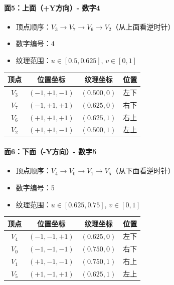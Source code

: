 \documentclass[12pt,a4paper]{article}
\begin{document}
\paragraph{面5：上面（+Y方向）- 数字4}

\begin{itemize}
    \item 顶点顺序：$V_3 \to V_7 \to V_6 \to V_2$（从上面看逆时针）
    \item 数字编号：4
    \item 纹理范围：$u \in [0.5, 0.625]$, $v \in [0, 1]$
\end{itemize}

\begin{table}[H]
\centering
\begin{tabular}{|c|c|c|c|}
\hline
\textbf{顶点} & \textbf{位置坐标} & \textbf{纹理坐标} & \textbf{位置} \\
\hline
$V_3$ & $(-1, +1, -1)$ & $(0.500, 0)$ & 左下 \\
$V_7$ & $(-1, +1, +1)$ & $(0.625, 0)$ & 右下 \\
$V_6$ & $(+1, +1, +1)$ & $(0.625, 1)$ & 右上 \\
$V_2$ & $(+1, +1, -1)$ & $(0.500, 1)$ & 左上 \\
\hline
\end{tabular}
\end{table}

\paragraph{面6：下面（-Y方向）- 数字5}

\begin{itemize}
    \item 顶点顺序：$V_4 \to V_0 \to V_1 \to V_5$（从下面看逆时针）
    \item 数字编号：5
    \item 纹理范围：$u \in [0.625, 0.75]$, $v \in [0, 1]$
\end{itemize}

\begin{table}[H]
\centering
\begin{tabular}{|c|c|c|c|}
\hline
\textbf{顶点} & \textbf{位置坐标} & \textbf{纹理坐标} & \textbf{位置} \\
\hline
$V_4$ & $(-1, -1, +1)$ & $(0.625, 0)$ & 左下 \\
$V_0$ & $(-1, -1, -1)$ & $(0.750, 0)$ & 右下 \\
$V_1$ & $(+1, -1, -1)$ & $(0.750, 1)$ & 右上 \\
$V_5$ & $(+1, -1, +1)$ & $(0.625, 1)$ & 左上 \\
\hline
\end{tabular}
\end{table}
\end{document}
